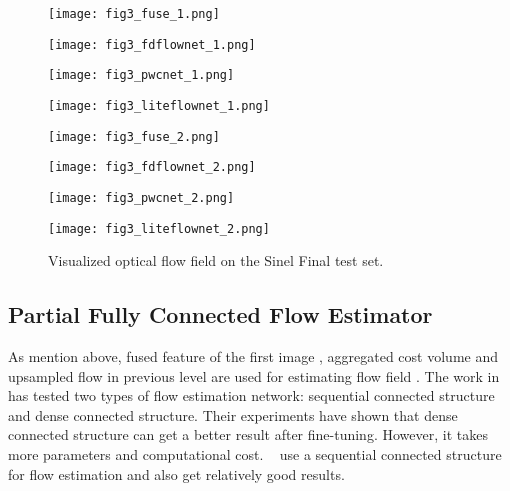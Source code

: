 \documentclass{article}
\begin{document}
\begin{figure*}[ht]
	\setlength{\abovecaptionskip}{2pt}
	\centering
	\begin{minipage}[b]{0.24\textwidth}
		\texttt{[image: fig3\_fuse\_1.png]}
	\end{minipage}
	\begin{minipage}[b]{0.24\textwidth}
		\texttt{[image: fig3\_fdflownet\_1.png]}
	\end{minipage}
	\begin{minipage}[b]{0.24\textwidth}
		\texttt{[image: fig3\_pwcnet\_1.png]}
	\end{minipage}
	\begin{minipage}[b]{0.24\textwidth}
		\texttt{[image: fig3\_liteflownet\_1.png]}
	\end{minipage}
	
	\begin{minipage}[b]{0.24\textwidth}
		\texttt{[image: fig3\_fuse\_2.png]}
	\end{minipage}
	\begin{minipage}[b]{0.24\textwidth}
		\texttt{[image: fig3\_fdflownet\_2.png]}
	\end{minipage}
	\begin{minipage}[b]{0.24\textwidth}
		\texttt{[image: fig3\_pwcnet\_2.png]}
	\end{minipage}
	\begin{minipage}[b]{0.24\textwidth}
		\texttt{[image: fig3\_liteflownet\_2.png]}
	\end{minipage}
	\caption{Visualized optical flow field on the Sinel Final test set.}
	\label{fig:3}
\end{figure*}

\subsection{Partial Fully Connected Flow Estimator}
As mention above, fused feature of the first image , aggregated cost volume  and upsampled flow in previous level  are used for estimating flow field . The work in~\cite{Sun_2018_CVPR} has tested two types of flow estimation network: sequential connected structure and dense connected structure. Their experiments have shown that dense connected structure can get a better result after fine-tuning. However, it takes more parameters and computational cost. ~\cite{Hui_2018_CVPR} use a sequential connected structure for flow estimation and also get relatively good results.
\end{document}
